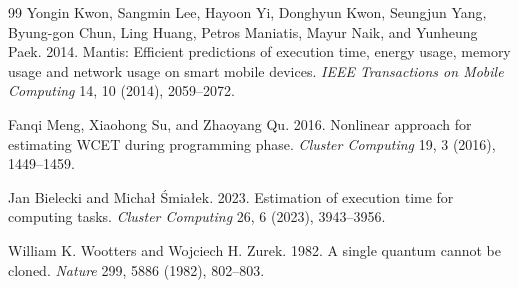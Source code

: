 \documentclass[11pt, a4paper]{article}
\begin{document}
\begin{thebibliography}{99}
Yongin Kwon, Sangmin Lee, Hayoon Yi, Donghyun Kwon, Seungjun Yang, Byung-gon Chun, Ling Huang, Petros Maniatis, Mayur Naik, and Yunheung Paek. 2014. Mantis: Efficient predictions of execution time, energy usage, memory usage and network usage on smart mobile devices. \textit{IEEE Transactions on Mobile Computing} 14, 10 (2014), 2059--2072.

Fanqi Meng, Xiaohong Su, and Zhaoyang Qu. 2016. Nonlinear approach for estimating WCET during programming phase. \textit{Cluster Computing} 19, 3 (2016), 1449--1459.

Jan Bielecki and Micha{\l} {\'S}mia{\l}ek. 2023. Estimation of execution time for computing tasks. \textit{Cluster Computing} 26, 6 (2023), 3943--3956.

William K. Wootters and Wojciech H. Zurek. 1982. A single quantum cannot be cloned. \textit{Nature} 299, 5886 (1982), 802--803.

\end{thebibliography}
\end{document}
